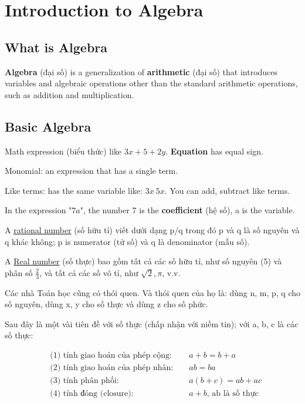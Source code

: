 \chapter{Introduction to Algebra}

\section{What is Algebra}

\textbf{Algebra} (đại số) is a generalization of \textbf{arithmetic} (đại số) that introduces variables and algebraic operations other than the standard arithmetic operations, such as addition and multiplication.

\section{Basic Algebra}

Math expression (biểu thức) like \(3x + 5 + 2y\). \textbf{Equation} has equal sign.

Monomial: an expression that has a single term.

Like terms: has the same variable like: \(3x\ 5x\). You can add, subtract like terms.

In the expression "\(7a\)", the number 7 is the \textbf{coefficient} (hệ số), a is the variable.

\vspace{5mm}

A \href{https://en.wikipedia.org/wiki/Rational_number}{rational number} (số hữu tỉ) viết dưới dạng p/q trong đó p và q là số nguyên và q khác không; p is numerator (tử số) và q là denominator (mẫu số).

A \href{https://en.wikipedia.org/wiki/Real_number}{Real number} (số thực) bao gồm tất cả các số hữu tỉ, như số nguyên (5) và phân số \(\frac{2}{3}\), và tất cả các số vô tỉ, như \(\sqrt{2}, \pi\), v.v.

Các nhà Toán học cũng có thói quen. Và thói quen của họ là: dùng n, m, p, q cho số nguyên, dùng x, y cho số thực và dùng z cho số phức.

Sau đây là một vài tiên đề với số thực (chấp nhận với niềm tin); với a, b, c là các số thực:

\begin{equation}
    \begin{aligned}
      &\text{(1) tính giao hoán của phép cộng: } &&a+b = b+a\\
      &\text{(2) tính giao hoán của phép nhân: } &&ab = ba\\
      &\text{(3) tính phân phối: } &&a(b+c) = ab + ac\\
      &\text{(4) tính đóng (closure): } &&a + b \text{, ab là số thực}\\
    \end{aligned}
    \label{key}
\end{equation}

